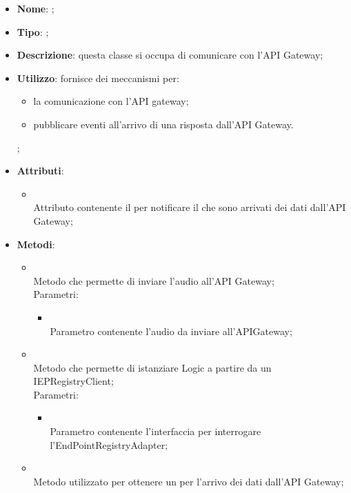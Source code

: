 \begin{itemize}
	\item \textbf{Nome}: ;
	\item \textbf{Tipo}: ;
	\item \textbf{Descrizione}: questa classe si occupa di comunicare con l'API Gateway;
	\item \textbf{Utilizzo}: fornisce dei meccanismi per:
\begin{itemize}
\item la comunicazione con l'API gateway;
\item pubblicare eventi all'arrivo di una risposta dall'API Gateway.
\end{itemize};
	\item \textbf{Attributi}:
	\begin{itemize}
		\item[]  \\
		Attributo contenente il  per notificare il  che sono arrivati dei dati dall'API Gateway;
	\end{itemize}
	\item \textbf{Metodi}:
	\begin{itemize}
		\item[]  \\
		Metodo che permette di inviare l'audio all'API Gateway;\\
		Parametri:
		\begin{itemize}
			\item {} \\
			Parametro contenente l'audio da inviare all'APIGateway;
		\end{itemize}
		\item[]  \\
		Metodo che permette di istanziare Logic a partire da un IEPRegistryClient;\\
		Parametri:
		\begin{itemize}
			\item {} \\
			Parametro contenente l'interfaccia per interrogare l'EndPointRegistryAdapter;
		\end{itemize}
		\item[]  \\
		Metodo utilizzato per ottenere un  per l'arrivo dei dati dall'API Gateway;\\

\end{itemize}
\end{itemize}
